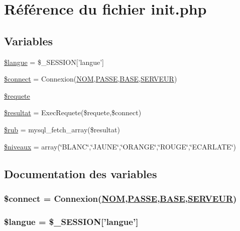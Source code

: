 \hypertarget{init_8php}{
\section{R\'{e}f\'{e}rence du fichier init.php}
\label{init_8php}
}
\subsection*{Variables}
\begin{CompactItemize}
\item 
\hyperlink{init_8php_a0}{\$langue} = \$\_\-SESSION\mbox{[}'langue'\mbox{]}
\item 
\hyperlink{init_8php_a1}{\$connect} = Connexion(\hyperlink{pma__connect_8php_a0}{NOM},\hyperlink{pma__connect_8php_a1}{PASSE},\hyperlink{pma__connect_8php_a3}{BASE},\hyperlink{pma__connect_8php_a2}{SERVEUR})
\item 
\hyperlink{init_8php_a2}{\$requete}
\item 
\hyperlink{init_8php_a3}{\$resultat} = Exec\-Requete(\$requete,\$connect)
\item 
\hyperlink{init_8php_a4}{\$rub} = mysql\_\-fetch\_\-array(\$resultat)
\item 
\hyperlink{init_8php_a5}{\$niveaux} = array(\char`\"{}BLANC\char`\"{},\char`\"{}JAUNE\char`\"{},\char`\"{}ORANGE\char`\"{},\char`\"{}ROUGE\char`\"{},\char`\"{}ECARLATE\char`\"{})
\end{CompactItemize}


\subsection{Documentation des variables}
\hypertarget{init_8php_a1}{
\subsubsection[\$connect]{\setlength{\rightskip}{0pt plus 5cm}\$connect = Connexion(\hyperlink{pma__connect_8php_a0}{NOM},\hyperlink{pma__connect_8php_a1}{PASSE},\hyperlink{pma__connect_8php_a3}{BASE},\hyperlink{pma__connect_8php_a2}{SERVEUR})}}
\label{init_8php_a1}


\hypertarget{init_8php_a0}{
\subsubsection[\$langue]{\setlength{\rightskip}{0pt plus 5cm}\$langue = \$\_\-SESSION\mbox{[}'langue'\mbox{]}}}
\label{init_8php_a0}


